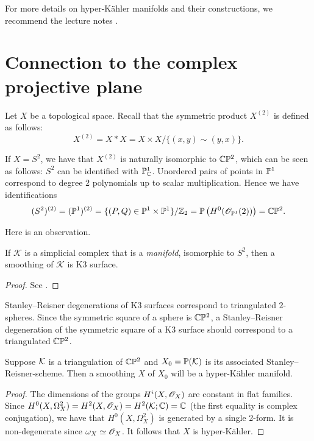 For more details on hyper-Kähler manifolds and their constructions, we recommend the lecture notes \cite{lehn_symplectic}.


\section{Connection to the complex projective plane}

Let $X$ be a topological space. Recall that the symmetric product $X^{(2)}$ is defined as follows:
\[
X^{(2)} = X \ast X = X \times X / \{ (x,y) \sim (y,x) \}.
\]

If $X=S^2$, we have that $X^{(2)}$ is naturally isomorphic to $\C \P^2$, which can be seen as follows: $S^2$ can be identified with $\P^1_\C$. Unordered pairs of points in $\P^1$ correspond to degree $2$ polynomials up to scalar multiplication. Hence we have identifications
$$
(S^2)^{(2)} = (\P^1)^{(2)} = \{ (P,Q) \in \P^1 \times \P^1 \} / \Z_2 = \P\left( H^0(\OO_{\P^1}(2)) \right)=\C \P^2.
$$

Here is an observation.

\begin{lemma}
If $\mathcal K$ is a simplicial complex that is a \emph{manifold}, isomorphic to $S^2$, then a smoothing of $\mathcal K$ is K3 surface.
\end{lemma}
\begin{proof}
See \cite{eisenbud_graphcurves}.
\end{proof}

Stanley--Reisner degenerations of K3 surfaces correspond to triangulated $2$-spheres. Since the symmetric square of a sphere is $\C \P ^2$, a Stanley--Reisner degeneration of the symmetric square of a K3 surface should correspond to a triangulated $\C \P^2$. 

\begin{proposition}
Suppose $\K$ is a triangulation of $\C \P^2$ and $X_0=\P(\K)$ is its associated Stanley--Reisner-scheme. Then a smoothing $X$ of $X_0$ will be a hyper-Kähler manifold.
\end{proposition}
\begin{proof}
The dimensions of the groups $H^i(X,\OO_X)$ are constant in flat families. Since $H^0(X,\Omega^2_X)=H^2(X,\OO_X)=H^2(\K;\C)=\C$ (the first equality is complex conjugation), we have that $H^0(X,\Omega^2_X)$ is generated by a single 2-form. It is non-degenerate since $\omega_X \simeq \OO_X$. It follows that $X$ is hyper-Kähler.
\end{proof}

